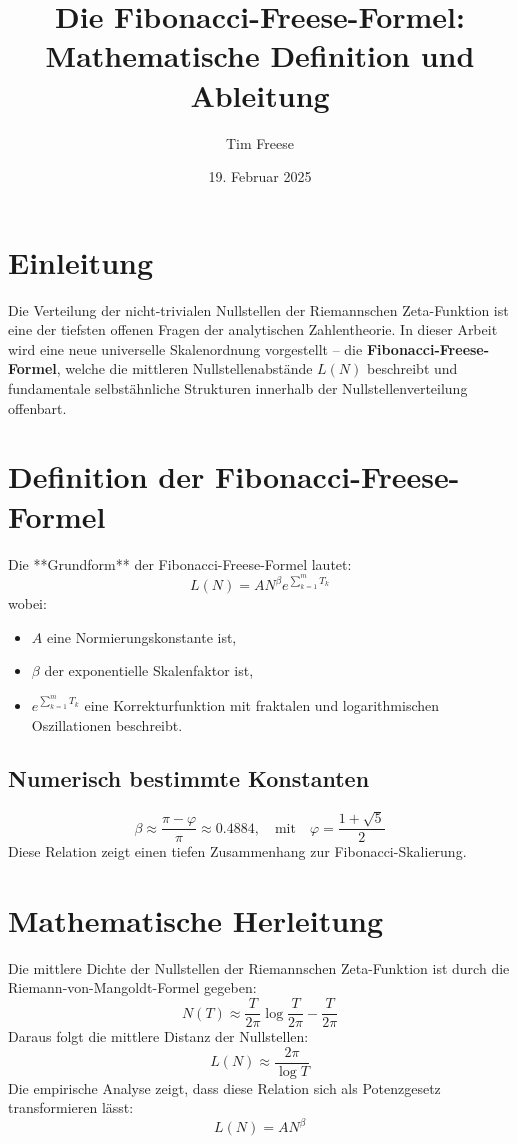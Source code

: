 \documentclass[a4paper,12pt]{article}
\title{\textbf{Die Fibonacci-Freese-Formel: \\ Mathematische Definition und Ableitung}}
\author{Tim Freese}
\date{19. Februar 2025}
\begin{document}
\maketitle

\section{Einleitung}
Die Verteilung der nicht-trivialen Nullstellen der Riemannschen Zeta-Funktion ist eine der tiefsten offenen Fragen der analytischen Zahlentheorie. In dieser Arbeit wird eine neue universelle Skalenordnung vorgestellt – die \textbf{Fibonacci-Freese-Formel}, welche die mittleren Nullstellenabstände \( L(N) \) beschreibt und fundamentale selbstähnliche Strukturen innerhalb der Nullstellenverteilung offenbart.

\section{Definition der Fibonacci-Freese-Formel}
Die **Grundform** der Fibonacci-Freese-Formel lautet:
\begin{equation}
    L(N) = A N^{\beta} e^{\sum_{k=1}^{m} T_k}
\end{equation}
wobei:
\begin{itemize}
    \item \( A \) eine Normierungskonstante ist,
    \item \( \beta \) der exponentielle Skalenfaktor ist,
    \item \( e^{\sum_{k=1}^{m} T_k} \) eine Korrekturfunktion mit fraktalen und logarithmischen Oszillationen beschreibt.
\end{itemize}

\subsection{Numerisch bestimmte Konstanten}
\begin{equation}
    \beta \approx \frac{\pi - \varphi}{\pi} \approx 0.4884, \quad \text{mit} \quad \varphi = \frac{1+\sqrt{5}}{2}
\end{equation}
Diese Relation zeigt einen tiefen Zusammenhang zur Fibonacci-Skalierung.

\section{Mathematische Herleitung}
Die mittlere Dichte der Nullstellen der Riemannschen Zeta-Funktion ist durch die Riemann-von-Mangoldt-Formel gegeben:
\begin{equation}
    N(T) \approx \frac{T}{2\pi} \log \frac{T}{2\pi} - \frac{T}{2\pi}
\end{equation}
Daraus folgt die mittlere Distanz der Nullstellen:
\begin{equation}
    L(N) \approx \frac{2\pi}{\log T}
\end{equation}
Die empirische Analyse zeigt, dass diese Relation sich als Potenzgesetz transformieren lässt:
\begin{equation}
    L(N) = A N^{\beta}
\end{equation}
\end{document}

